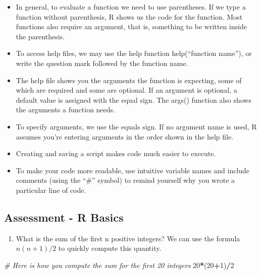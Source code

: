 \documentclass[]{article}
\newenvironment{Shaded}{\begin{snugshade}}{\end{snugshade}}
\newcommand{\CommentTok}[1]{\textcolor[rgb]{0.56,0.35,0.01}{\textit{#1}}}
\newcommand{\DecValTok}[1]{\textcolor[rgb]{0.00,0.00,0.81}{#1}}
\newcommand{\NormalTok}[1]{#1}
\newcommand{\OperatorTok}[1]{\textcolor[rgb]{0.81,0.36,0.00}{\textbf{#1}}}
\providecommand{\tightlist}{%
  \setlength{\itemsep}{0pt}\setlength{\parskip}{0pt}}
\begin{document}
\begin{itemize}
\tightlist
\item
  In general, to evaluate a function we need to use parentheses. If we
  type a function without parenthesis, R shows us the code for the
  function. Most functions also require an argument, that is, something
  to be written inside the parenthesis.
\item
  To access help files, we may use the help function help(``function
  name''), or write the question mark followed by the function name.
\item
  The help file shows you the arguments the function is expecting, some
  of which are required and some are optional. If an argument is
  optional, a default value is assigned with the equal sign. The args()
  function also shows the arguments a function needs.
\item
  To specify arguments, we use the equals sign. If no argument name is
  used, R assumes you're entering arguments in the order shown in the
  help file.
\item
  Creating and saving a script makes code much easier to execute.
\item
  To make your code more readable, use intuitive variable names and
  include comments (using the ``\#'' symbol) to remind yourself why you
  wrote a particular line of code.
\end{itemize}

\hypertarget{assessment---r-basics}{%
\subsection{Assessment - R Basics}\label{assessment---r-basics}}

\begin{enumerate}
\def\labelenumi{\arabic{enumi}.}
\tightlist
\item
  What is the sum of the first n positive integers? We can use the
  formula \(n(n+1)/2\) to quickly compute this quantity.
\end{enumerate}

\begin{Shaded}
\begin{Highlighting}[]
\CommentTok{# Here is how you compute the sum for the first 20 integers}
\DecValTok{20}\OperatorTok{*}\NormalTok{(}\DecValTok{20}\OperatorTok{+}\DecValTok{1}\NormalTok{)}\OperatorTok{/}\DecValTok{2} 
\end{Highlighting}
\end{Shaded}
\end{document}
